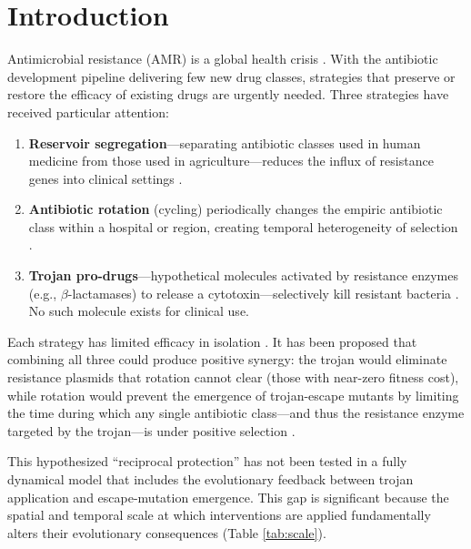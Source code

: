 \documentclass[12pt,a4paper]{article}
\begin{document}
\section{Introduction}

Antimicrobial resistance (AMR) is a global health crisis \cite{amr2022}. With the antibiotic development pipeline delivering few new drug classes, strategies that preserve or restore the efficacy of existing drugs are urgently needed. Three strategies have received particular attention:

\begin{enumerate}
    \item \textbf{Reservoir segregation}---separating antibiotic classes used in human medicine from those used in agriculture---reduces the influx of resistance genes into clinical settings \cite{who2019, ecdc2023}.
    \item \textbf{Antibiotic rotation} (cycling) periodically changes the empiric antibiotic class within a hospital or region, creating temporal heterogeneity of selection \cite{kollef2001, merz2006}.
    \item \textbf{Trojan pro-drugs}---hypothetical molecules activated by resistance enzymes (e.g., $\beta$-lactamases) to release a cytotoxin---selectively kill resistant bacteria \cite{evans2015, law2021}. No such molecule exists for clinical use.
\end{enumerate}

Each strategy has limited efficacy in isolation \cite{vanloon2018, saturn2018, ecdc_efsa_ema2023}. It has been proposed that combining all three could produce positive synergy: the trojan would eliminate resistance plasmids that rotation cannot clear (those with near-zero fitness cost), while rotation would prevent the emergence of trojan-escape mutants by limiting the time during which any single antibiotic class---and thus the resistance enzyme targeted by the trojan---is under positive selection \cite{beardmore2017}.

This hypothesized ``reciprocal protection'' has not been tested in a fully dynamical model that includes the evolutionary feedback between trojan application and escape-mutation emergence. This gap is significant because the spatial and temporal scale at which interventions are applied fundamentally alters their evolutionary consequences (Table \ref{tab:scale}).
\end{document}
